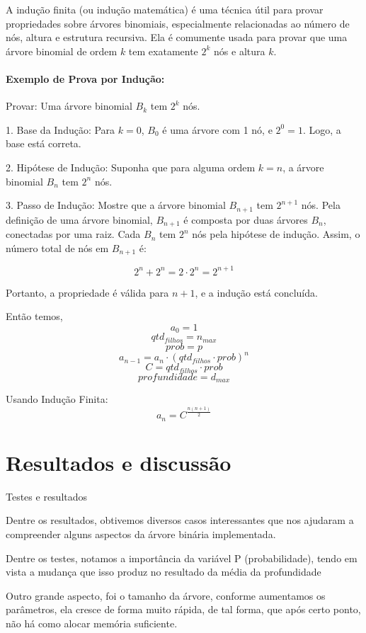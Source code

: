 \documentclass[12pt, a4paper]{scrreprt}
\begin{document}
A indução finita (ou indução matemática) é uma técnica útil para provar propriedades sobre árvores binomiais, especialmente relacionadas ao número de nós, altura e estrutura recursiva. Ela é comumente usada para provar que uma árvore binomial de ordem \( k \) tem exatamente \( 2^k \) nós e altura \( k \).

\subsubsection{Exemplo de Prova por Indução:}
Provar: Uma árvore binomial \( B_k \) tem \( 2^k \) nós.

1. Base da Indução: Para \( k = 0 \), \( B_0 \) é uma árvore com 1 nó, e \( 2^0 = 1 \). Logo, a base está correta.

2. Hipótese de Indução: Suponha que para alguma ordem \( k = n \), a árvore binomial \( B_n \) tem \( 2^n \) nós.

3. Passo de Indução: Mostre que a árvore binomial \( B_{n+1} \) tem \( 2^{n+1} \) nós. Pela definição de uma árvore binomial, \( B_{n+1} \) é composta por duas árvores \( B_n \), conectadas por uma raiz. Cada \( B_n \) tem \( 2^n \) nós pela hipótese de indução. Assim, o número total de nós em \( B_{n+1} \) é:

\[
2^n + 2^n = 2 \cdot 2^n = 2^{n+1}
\]

Portanto, a propriedade é válida para \( n+1 \), e a indução está concluída.

Então temos,
\[ a_0 = 1 \]
\[ qtd_{filhos} = n_{max} \]
\[ prob = p \]
\[ a_{n-1} = a_n \cdot (qtd_{filhos} \cdot prob)^n \]
\[ C = qtd_{filhos} \cdot prob \]
\[ profundidade = d_{max} \]

Usando Indução Finita: \[ a_n = C^{\frac{n(n+1)}{2}} \]

\chapter{Resultados e discussão}
Testes e resultados

Dentre os resultados, obtivemos diversos casos interessantes que nos ajudaram a compreender alguns aspectos da árvore binária implementada.

Dentre os testes, notamos a importância da variável P (probabilidade), tendo em vista a mudança que isso produz no resultado da média da profundidade

Outro grande aspecto, foi o tamanho da árvore, conforme aumentamos os parâmetros, ela cresce de forma muito rápida, de tal forma, que após certo ponto, não há como alocar memória suficiente.
\end{document}
